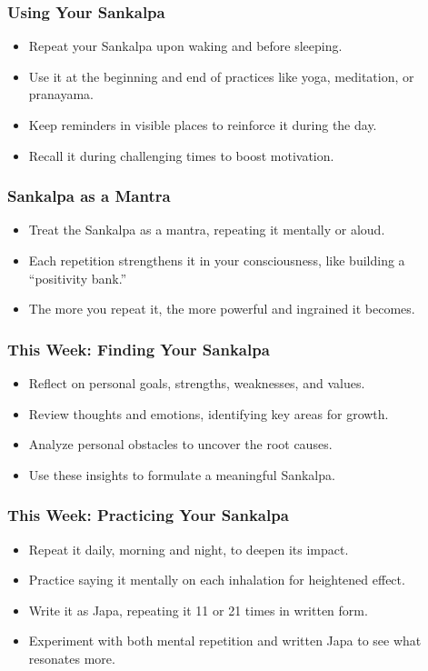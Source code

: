 \begin{frame}[fragile]\frametitle{Using Your Sankalpa}
    \begin{itemize}
        \item Repeat your Sankalpa upon waking and before sleeping.
        \item Use it at the beginning and end of practices like yoga, meditation, or pranayama.
        \item Keep reminders in visible places to reinforce it during the day.
        \item Recall it during challenging times to boost motivation.
    \end{itemize}
\end{frame}

\begin{frame}[fragile]\frametitle{Sankalpa as a Mantra}
    \begin{itemize}
        \item Treat the Sankalpa as a mantra, repeating it mentally or aloud.
        \item Each repetition strengthens it in your consciousness, like building a “positivity bank.”
        \item The more you repeat it, the more powerful and ingrained it becomes.
    \end{itemize}
\end{frame}

\begin{frame}[fragile]\frametitle{This Week: Finding Your Sankalpa}
    \begin{itemize}
        \item Reflect on personal goals, strengths, weaknesses, and values.
        \item Review thoughts and emotions, identifying key areas for growth.
        \item Analyze personal obstacles to uncover the root causes.
        \item Use these insights to formulate a meaningful Sankalpa.
    \end{itemize}
\end{frame}

\begin{frame}[fragile]\frametitle{This Week: Practicing Your Sankalpa}
    \begin{itemize}
        \item Repeat it daily, morning and night, to deepen its impact.
        \item Practice saying it mentally on each inhalation for heightened effect.
        \item Write it as Japa, repeating it 11 or 21 times in written form.
        \item Experiment with both mental repetition and written Japa to see what resonates more.
    \end{itemize}
\end{frame}

